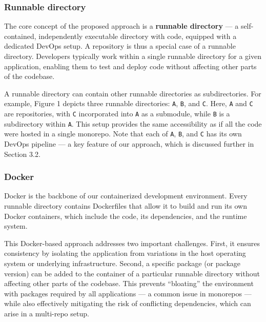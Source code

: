 \documentclass{article}
\begin{document}
\subsubsection{Runnable directory}

The core concept of the proposed approach is a \textbf{runnable directory} --- a
self-contained, independently executable directory with code, equipped with a
dedicated DevOps setup. A repository is thus a special case of a runnable directory.
Developers typically work within a single runnable directory for a given
application, enabling them to test and deploy code without affecting other parts
of the codebase.

A runnable directory can contain other runnable directories as subdirectories.
For example, Figure 1 depicts three runnable directories: \texttt{A}, \texttt{B},
and \texttt{C}. Here, \texttt{A} and \texttt{C} are repositories, with \texttt{C}
incorporated into \texttt{A} as a submodule, while \texttt{B} is a subdirectory
within \texttt{A}. This setup provides the same accessibility as if all the code
were hosted in a single monorepo. Note that each of \texttt{A}, \texttt{B}, and \texttt{C}
has its own DevOps pipeline --- a key feature of our approach, which is discussed
further in Section 3.2.

%
%

\subsubsection{Docker}

Docker is the backbone of our containerized development environment. Every
runnable directory contains Dockerfiles that allow it to build and run its own
Docker containers, which include the code, its dependencies, and the runtime system.

This Docker-based approach addresses two important challenges. First, it ensures
consistency by isolating the application from variations in the host operating system
or underlying infrastructure. Second, a specific package (or package version) can
be added to the container of a particular runnable directory without affecting other
parts of the codebase. This prevents ``bloating'' the environment with packages
required by all applications --- a common issue in monorepos --- while also
effectively mitigating the risk of conflicting dependencies, which can arise in a
multi-repo setup.
\end{document}
